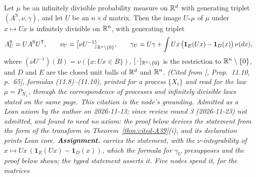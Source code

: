 \begin{theorem}
\label{thm:cited-A42}
\leanok
{}
Let $\mu$ be an infinitely divisible probability measure on $\mathbb{R}^d$ with generating triplet
$(A^{\mathrm S}, \nu, \gamma)$, and let $U$ be an $n \times d$ matrix. Then the image $U_*\mu$ of $\mu$ under
$x \mapsto Ux$ is infinitely divisible on $\mathbb{R}^n$, with generating triplet
\[
  A^{\mathrm S}_U = UA^{\mathrm S}U^{\mathsf{T}}, \qquad \nu_U = \bigl[\nu U^{-1}\bigr]_{\mathbb{R}^n \setminus \{0\}}, \qquad
  \gamma_U = U\gamma + \int Ux\,\bigl(\mathbf{1}_E(Ux) - \mathbf{1}_D(x)\bigr)\,\nu(dx),
\]
where $(\nu U^{-1})(B) = \nu(\{x : Ux \in B\})$, $[\,\cdot\,]_{\mathbb{R}^n \setminus \{0\}}$ is the
restriction to $\mathbb{R}^n \setminus \{0\}$, and $D$ and $E$ are the closed unit balls of $\mathbb{R}^d$ and
$\mathbb{R}^n$.
\statusA\quad{}\quad\emph{(Cited from [, Prop.~11.10, p.~65],
formulas (11.8)--(11.10), printed for a \Levy{} process $\{X_t\}$ and read for the law
$\mu = P_{X_1}$, through the correspondence of \Levy{} processes and infinitely divisible laws
stated on the same page. This citation is the node's grounding. Admitted as a Lean axiom by the
author on 2026-11-13; since review round 3 (2026-11-23) not admitted, and found to need no axiom:
the proof below derives the statement from the form of the transform in
Theorem~\ref{thm:cited-A39}(i), and its declaration prints Lean core.
\textbf{Assignment.}  carries the statement, with the $\nu$-integrability of
$x \mapsto Ux\,(\mathbf{1}_E(Ux) - \mathbf{1}_D(x))$, which the formula for $\gamma_U$ presupposes
and the proof below shows; the typed statement asserts it. Five nodes spend it, for the matrices
}
\end{theorem}
